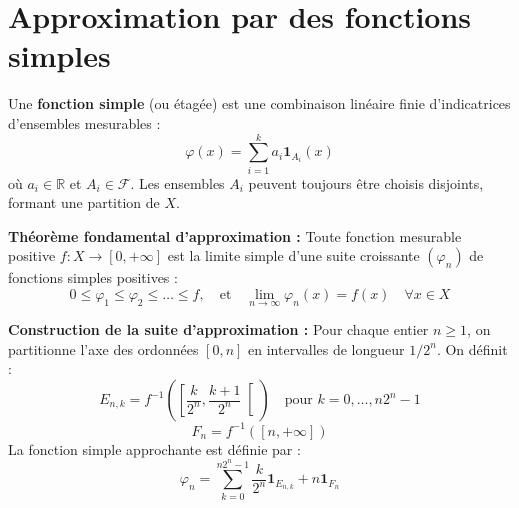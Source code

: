 \documentclass[11pt,a4paper]{article}
\begin{document}
\section{Approximation par des fonctions simples}

Une \textbf{fonction simple} (ou étagée) est une combinaison linéaire finie d'indicatrices d'ensembles mesurables :
$$ \varphi(x) = \sum_{i=1}^k a_i \mathbf{1}_{A_i}(x) $$
où $a_i \in \mathbb{R}$ et $A_i \in \mathcal{F}$. Les ensembles $A_i$ peuvent toujours être choisis disjoints, formant une partition de $X$.

\textbf{Théorème fondamental d'approximation :}
Toute fonction mesurable positive $f : X \to [0, +\infty]$ est la limite simple d'une suite croissante $(\varphi_n)$ de fonctions simples positives :
$$ 0 \leq \varphi_1 \leq \varphi_2 \leq \dots \leq f, \quad \text{et} \quad \lim_{n \to \infty} \varphi_n(x) = f(x) \quad \forall x \in X $$

\textbf{Construction de la suite d'approximation :}
Pour chaque entier $n \geq 1$, on partitionne l'axe des ordonnées $[0, n]$ en intervalles de longueur $1/2^n$. On définit :
$$ E_{n,k} = f^{-1}\left( \left[ \frac{k}{2^n}, \frac{k+1}{2^n} \right[ \right) \quad \text{pour } k=0, \dots, n2^n-1 $$
$$ F_n = f^{-1}([n, +\infty]) $$
La fonction simple approchante est définie par :
$$ \varphi_n = \sum_{k=0}^{n2^n-1} \frac{k}{2^n} \mathbf{1}_{E_{n,k}} + n \mathbf{1}_{F_n} $$

\begin{center}
\end{center}
\end{document}
